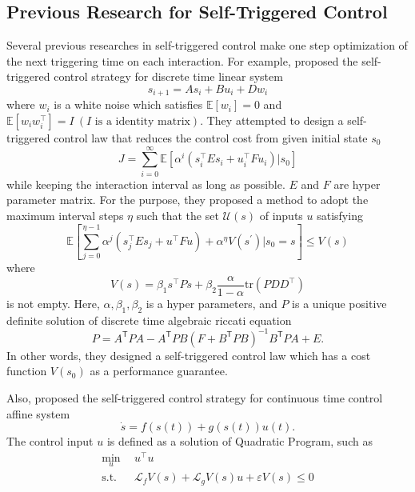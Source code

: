\documentclass[english, dvipdfmx]{ampmt}             %
\newcommand{\expect}{\mathbb{E}}
\begin{document}
\subsection{Previous Research for Self-Triggered Control}
Several previous researches in self-triggered control make one step optimization of the next triggering time on each interaction. For example, \cite{STC} proposed the self-triggered control strategy for discrete time linear system
\begin{equation*}
	s_{i+1} = As_i + Bu_i + Dw_i
\end{equation*}
where $w_i$ is a white noise which satisfies $\expect[w_i] = 0$ and $\expect[w_iw_i^{\top}]=I~(I  \textrm{ is a identity matrix})$.
They attempted to design a self-triggered control law that reduces the control cost from given initial state $s_0$
\begin{equation*}
	J = \sum_{i = 0}^{\infty}\expect[\alpha^i(s_i^{\top}Es_i+u_i^{\top}Fu_i)|s_0]
\end{equation*}
while keeping the interaction interval as long as possible. $E$ and $F$ are hyper parameter matrix. For the purpose, they proposed a method to adopt the maximum interval steps $\eta$ such that 
the set $\mathcal{U}(s)$ of inputs $u$ satisfying
\begin{equation*}
	\expect[\sum_{j=0}^{\eta-1}\alpha^{j}(s_j^{\top}Es_j+u^{\top}Fu)+\alpha^{\eta}V(s^{\prime})|s_0=s] \leq V(s)
\end{equation*}
where
\begin{equation*}
	V(s) = \beta_1s^{\top}Ps + \beta_2\frac{\alpha}{1-\alpha}\textrm{tr}(PDD^{\top})
\end{equation*}
is not empty. Here, $\alpha, \beta_1, \beta_2$ is a hyper parameters, and $P$ is a unique positive definite solution of discrete time algebraic riccati equation 
\begin{equation*}
	P = A^\mathsf{T}PA-A^\mathsf{T}PB\left(F+B^\mathsf{T}PB\right)^{-1}B^\mathsf{T}PA+E.
\end{equation*}
In other words, they designed a self-triggered control law which has a cost function $V(s_0)$ as a performance guarantee. \par
Also, \cite{ECBF} proposed the self-triggered control strategy for continuous time control affine system 
\begin{equation*}
	\dot{s} = f(s(t)) + g(s(t))u(t).
\end{equation*}
The control input $u$ is defined as a solution of Quadratic Program, such as
\begin{align*}
	\min_{u}~~&u^{\top}u \\
	\textrm{s.t.}~~&\mathcal{L}_fV(s)+\mathcal{L}_gV(s)u+\varepsilon V(s)\leq 0
\end{align*}
\end{document}
